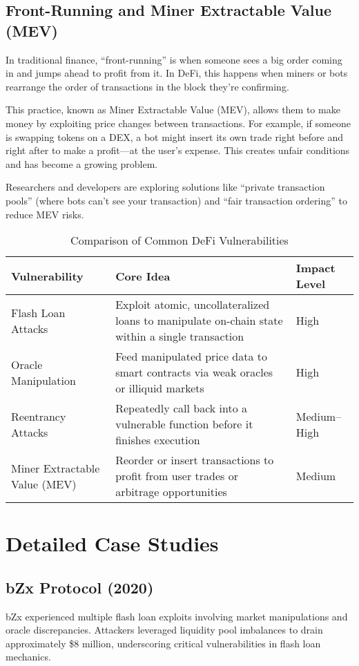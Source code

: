 \documentclass[conference]{IEEEtran}
\begin{document}
\subsection{Front-Running and Miner Extractable Value (MEV)}

In traditional finance, “front-running” is when someone sees a big order coming in and jumps ahead to profit from it. In DeFi, this happens when miners or bots rearrange the order of transactions in the block they're confirming. 

This practice, known as Miner Extractable Value (MEV), allows them to make money by exploiting price changes between transactions. For example, if someone is swapping tokens on a DEX, a bot might insert its own trade right before and right after to make a profit—at the user's expense. This creates unfair conditions and has become a growing problem.

Researchers and developers are exploring solutions like “private transaction pools” (where bots can't see your transaction) and “fair transaction ordering” to reduce MEV risks.

\begin{table}[H]
\caption{Comparison of Common DeFi Vulnerabilities}
\centering
\begin{tabular}{@{}p{2.5cm}p{4.5cm}p{1.6cm}@{}}
\toprule
\textbf{Vulnerability} & \textbf{Core Idea} & \textbf{Impact Level} \\
\midrule
Flash Loan Attacks & Exploit atomic, uncollateralized loans to manipulate on-chain state within a single transaction & High \\
Oracle Manipulation & Feed manipulated price data to smart contracts via weak oracles or illiquid markets & High \\
Reentrancy Attacks & Repeatedly call back into a vulnerable function before it finishes execution & Medium–High \\
Miner Extractable Value (MEV) & Reorder or insert transactions to profit from user trades or arbitrage opportunities & Medium \\
\bottomrule
\end{tabular}
\label{tab:vulnerability_comparison}
\end{table}


\section{Detailed Case Studies}

\subsection{bZx Protocol (2020)}
bZx experienced multiple flash loan exploits involving market manipulations and oracle discrepancies. Attackers leveraged liquidity pool imbalances to drain approximately \$8 million, underscoring critical vulnerabilities in flash loan mechanics.
\end{document}
